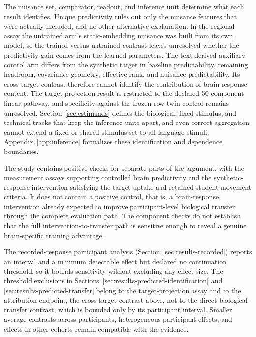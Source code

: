 The nuisance set, comparator, readout, and inference unit determine what each result identifies.
Unique predictivity rules out only the nuisance features that were actually included, and no other alternative explanation.
In the regional assay the untrained arm's static-embedding nuisance was built from its own model, so the trained-versus-untrained contrast leaves unresolved whether the predictivity gain comes from the learned parameters.
The text-derived auxiliary-control arm differs from the synthetic target in baseline predictability, remaining headroom, covariance geometry, effective rank, and nuisance predictability.
Its cross-target contrast therefore cannot identify the contribution of brain-response content.
The target-projection result is restricted to the declared 50-component linear pathway, and specificity against the frozen row-twin control remains unresolved.
Section~\ref{sec:estimands} defines the biological, fixed-stimulus, and technical tracks that keep the inference units apart, and even correct aggregation cannot extend a fixed or shared stimulus set to all language stimuli.
Appendix~\ref{app:inference} formalizes these identification and dependence boundaries.

The study contains positive checks for separate parts of the argument, with the measurement assays supporting controlled brain predictivity and the synthetic-response intervention satisfying the target-uptake and retained-student-movement criteria.
It does not contain a positive control, that is, a brain-response intervention already expected to improve participant-level biological transfer through the complete evaluation path.
The component checks do not establish that the full intervention-to-transfer path is sensitive enough to reveal a genuine brain-specific training advantage.

The recorded-response participant analysis (Section~\ref{sec:results-recorded}) reports an interval and a minimum detectable effect but declared no continuation threshold, so it bounds sensitivity without excluding any effect size.
The threshold exclusions in Sections~\ref{sec:results-predicted-identification} and \ref{sec:results-predicted-transfer} belong to the target-projection assay and to the attribution endpoint, the cross-target contrast above, not to the direct biological-transfer contrast, which is bounded only by its participant interval.
Smaller average contrasts across participants, heterogeneous participant effects, and effects in other cohorts remain compatible with the evidence.


